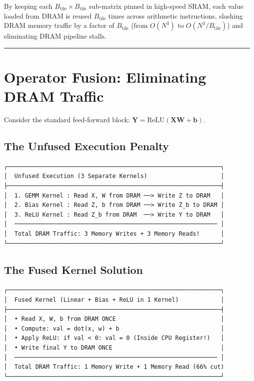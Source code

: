 \documentclass[
  letterpaper,
]{scrbook}
\begin{document}
By keeping each \(B_{\text{tile}} \times B_{\text{tile}}\) sub-matrix
pinned in high-speed SRAM, each value loaded from DRAM is reused
\(B_{\text{tile}}\) times across arithmetic instructions, slashing DRAM
memory traffic by a factor of \(B_{\text{tile}}\) (from \(O(N^3)\) to
\(O(N^3 / B_{\text{tile}})\)) and eliminating DRAM pipeline stalls.

\begin{center}\rule{0.5\linewidth}{0.5pt}\end{center}

\section{Operator Fusion: Eliminating DRAM
Traffic}\label{operator-fusion-eliminating-dram-traffic}

Consider the standard feed-forward block:
\(\mathbf{Y} = \text{ReLU}(\mathbf{X} \mathbf{W} + \mathbf{b})\).

\subsection{The Unfused Execution
Penalty}\label{the-unfused-execution-penalty}

\begin{verbatim}
┌─────────────────────────────────────────────────────────────┐
│  Unfused Execution (3 Separate Kernels)                     │
├─────────────────────────────────────────────────────────────┤
│  1. GEMM Kernel : Read X, W from DRAM ──> Write Z to DRAM   │
│  2. Bias Kernel : Read Z, b from DRAM ──> Write Z_b to DRAM │
│  3. ReLU Kernel : Read Z_b from DRAM  ──> Write Y to DRAM   │
│  ────────────────────────────────────────────────────────── │
│  Total DRAM Traffic: 3 Memory Writes + 3 Memory Reads!      │
└─────────────────────────────────────────────────────────────┘
\end{verbatim}

\subsection{The Fused Kernel Solution}\label{the-fused-kernel-solution}

\begin{verbatim}
┌─────────────────────────────────────────────────────────────┐
│  Fused Kernel (Linear + Bias + ReLU in 1 Kernel)            │
├─────────────────────────────────────────────────────────────┤
│  • Read X, W, b from DRAM ONCE                              │
│  • Compute: val = dot(x, w) + b                             │
│  • Apply ReLU: if val < 0: val = 0 (Inside CPU Register!)   │
│  • Write final Y to DRAM ONCE                               │
│  ────────────────────────────────────────────────────────── │
│  Total DRAM Traffic: 1 Memory Write + 1 Memory Read (66% cut)
└─────────────────────────────────────────────────────────────┘
\end{verbatim}
\end{document}
